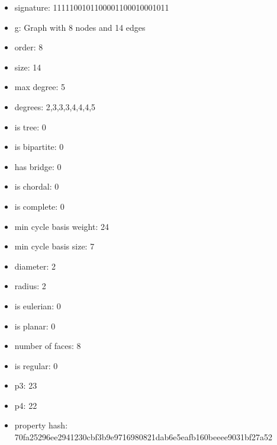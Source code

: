 \begin{itemize}
\item signature: 1111100101100001100010001011
\item g: Graph with 8 nodes and 14 edges
\item order: 8
\item size: 14
\item max degree: 5
\item degrees: 2,3,3,3,4,4,4,5
\item is tree: 0
\item is bipartite: 0
\item has bridge: 0
\item is chordal: 0
\item is complete: 0
\item min cycle basis weight: 24
\item min cycle basis size: 7
\item diameter: 2
\item radius: 2
\item is eulerian: 0
\item is planar: 0
\item number of faces: 8
\item is regular: 0
\item p3: 23
\item p4: 22
\item property hash: 70fa25296ee2941230cbf3b9e9716980821dab6e5eafb160beeee9031bf27a52
\end{itemize}
\newpage
\begin{figure}
\end{figure}
